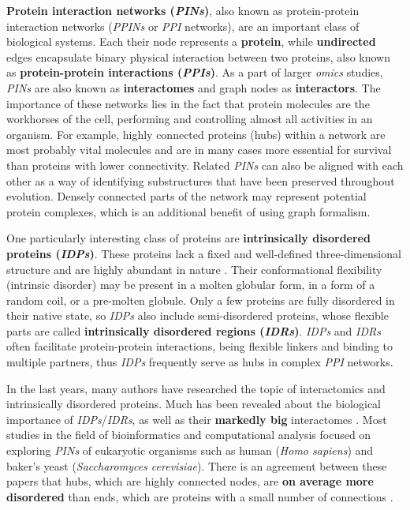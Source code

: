 \documentclass[a4paper]{article}
\begin{document}
\textbf{Protein interaction networks (\textit{PINs})}, also known as protein-protein interaction networks (\textit{PPINs} or \textit{PPI} networks), are an important class of biological systems. Each their node represents a \textbf{protein}, while \textbf{undirected} edges encapsulate binary physical interaction between two proteins, also known as \textbf{protein-protein interactions (\textit{PPIs})}. As a part of larger \textit{omics} studies, \textit{PINs} are also known as \textbf{interactomes} and graph nodes as \textbf{interactors}. The importance of these networks lies in the fact that protein molecules are the workhorses of the cell, performing and controlling almost all activities in an organism. For example, highly connected proteins (hubs) within a network are most probably vital molecules and are in many cases more essential for survival than proteins with lower connectivity. Related \textit{PINs} can also be aligned with each other as a way of identifying substructures that have been preserved throughout evolution. Densely connected parts of the network may represent potential protein complexes, which is an additional benefit of using graph formalism.

One particularly interesting class of proteins are \textbf{intrinsically disordered proteins (\textit{IDPs})}. These proteins lack a fixed and well-defined three-dimensional structure and are highly abundant in nature \cite{uversky}. Their conformational flexibility (intrinsic disorder) may be present in a molten globular form, in a form of a random coil, or a pre-molten globule. Only a few proteins are fully disordered in their native state, so \textit{IDPs} also include semi-disordered proteins, whose flexible parts are called \textbf{intrinsically disordered regions (\textit{IDRs})}. \textit{IDPs} and \textit{IDRs} often facilitate protein-protein interactions, being flexible linkers and binding to multiple partners, thus \textit{IDPs} frequently serve as hubs in complex \textit{PPI} networks.

In the last years, many authors have researched the topic of interactomics and intrinsically disordered proteins. Much has been revealed about the biological importance of \textit{IDPs}/\textit{IDRs}, as well as their \textbf{markedly big} interactomes \cite{teilum, cumberworth}. Most studies in the field of bioinformatics and computational analysis focused on exploring \textit{PINs} of eukaryotic organisms such as human (\textit{Homo sapiens}) and baker's yeast (\textit{Saccharomyces cerevisiae}). There is an agreement between these papers that hubs, which are highly connected nodes, are \textbf{on average more disordered} than ends, which are proteins with a small number of connections \cite{haynes, dosztanyi, singh, patil, hu}.
\end{document}
